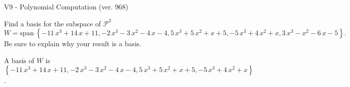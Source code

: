 \begin{exercise}
  \begin{exerciseTitle}V9 - Polynomial Computation (ver. 968)\end{exerciseTitle}
  \begin{exerciseStatement}
    Find a basis for the subspace of \(\mathcal{P}^3\) 
\[W=\mathrm{span}\ \left\{-11 \, x^{3} + 14 \, x + 11 , -2 \, x^{3} - 3 \, x^{2} - 4 \, x - 4 , 5 \, x^{3} + 5 \, x^{2} + x + 5 , -5 \, x^{3} + 4 \, x^{2} + x , 3 \, x^{3} - x^{2} - 6 \, x - 5\right\}.\]
 Be sure to explain why your result is a basis.


  \end{exerciseStatement}
  \begin{exerciseAnswer}
   A basis of \(W\) is  \(\left\{-11 \, x^{3} + 14 \, x + 11 , -2 \, x^{3} - 3 \, x^{2} - 4 \, x - 4 , 5 \, x^{3} + 5 \, x^{2} + x + 5 , -5 \, x^{3} + 4 \, x^{2} + x\right\}\).
  


  \end{exerciseAnswer}
\end{exercise}